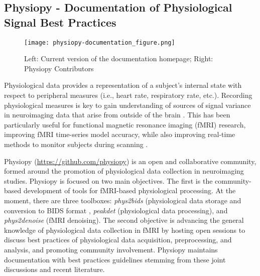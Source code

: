 \documentclass[../main.tex]{subfiles}
\begin{document}
\subsection{Physiopy - Documentation of Physiological Signal Best Practices}

%


\begin{figure}
	\centering
	\texttt{[image: physiopy-documentation\_figure.png]}
	\caption{Left: Current version of the documentation homepage; Right: Physiopy Contributors}
	\label{fig:physiopy_beforeafter}
\end{figure}


Physiological data provides a representation of a subject’s internal state with respect to peripheral measures (i.e., heart rate, respiratory rate, etc.). Recording physiological measures is key to gain understanding of sources of signal variance in neuroimaging data that arise from outside of the brain \parencite{chen2020}. This has been particularly useful for functional magnetic resonance imaging (fMRI) research, improving fMRI time-series model accuracy, while also improving real-time methods to monitor subjects during scanning \parencite{bulte2017, caballero-gaudes2017}. 

Physiopy (\url{https://github.com/physiopy}) is an open and collaborative community, formed around the promotion of physiological data collection in neuroimaging studies. Physiopy is focused on two main objectives. The first is the community-based development of tools for fMRI-based physiological processing. At the moment, there are three toolboxes: \textit{phys2bids} (physiological data storage and conversion to BIDS format \parencite{phys2bids}, \textit{peakdet} (physiological data processing), and \textit{phys2denoise} (fMRI denoising). The second objective is advancing the general knowledge of physiological data collection in fMRI by hosting open sessions to discuss best practices of physiological data acquisition, preprocessing, and analysis, and promoting community involvement. Physiopy maintains documentation with best practices guidelines stemming from these joint discussions and recent literature.
\end{document}
